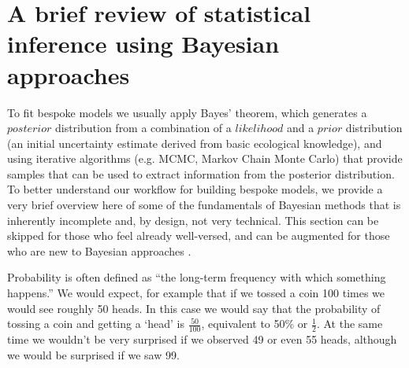 \documentclass[11pt]{article}
\begin{document}
\section*{A brief review of statistical inference using Bayesian approaches}

To fit bespoke models we usually apply Bayes' theorem, which generates a $posterior$ distribution from a combination of a $likelihood$ and a $prior$ distribution (an initial uncertainty estimate derived from basic ecological knowledge), and using iterative algorithms (e.g. MCMC, Markov Chain Monte Carlo) that provide samples that can be used to extract information from the posterior distribution. %
To better understand our workflow for building bespoke models, we provide a very brief overview here of some of the fundamentals of Bayesian methods that is inherently incomplete and, by design, not very technical. This section can be skipped for those who feel already well-versed, and can be augmented for those who are new to Bayesian approaches \citep[for example,][]{statrethink,BDA,regotherstories}.

Probability is often defined as ``the long-term frequency with which something happens.'' We would expect, for example that if we tossed a coin 100 times we would see roughly 50 heads. In this case we would say that the probability of tossing a coin and getting a `head' is $\frac{50}{100}$, equivalent to 50\% or $\frac{1}{2}$. At the same time we wouldn't be very surprised if we observed 49 or even 55 heads, although we would be surprised if we saw 99.
\end{document}
